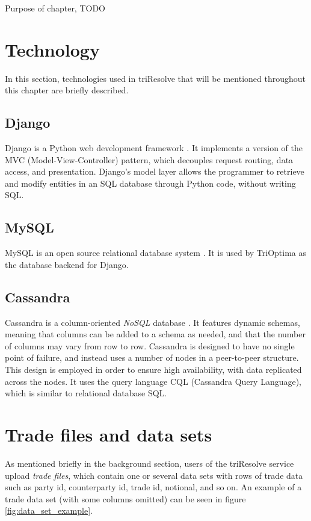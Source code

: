 Purpose of chapter, TODO

\section{Technology}
In this section, technologies used in triResolve that will be mentioned throughout this chapter are briefly described.

\subsection{Django}
Django is a Python web development framework \cite{holovaty_chapter_c1itd}. It implements a version of the MVC (Model-View-Controller) pattern, which decouples request routing, data access, and
presentation. Django's model layer allows the programmer to retrieve and modify entities in an SQL database through Python code, without writing SQL.

\subsection{MySQL}
MySQL is an open source relational database system \cite{what_wim}. It is used by TriOptima as the database backend for Django.

\subsection{Cassandra}
Cassandra is a column-oriented \textit{NoSQL} database \cite[p. 1-9]{mishra_2014_beginning_bacd}. It features dynamic schemas, meaning that columns can be added to a schema as needed, and that
the number of columns may vary from row to row. Cassandra is designed to have no single point of failure, and instead uses a number of nodes in a peer-to-peer structure. This design is
employed in order to ensure high availability, with data replicated across the nodes. It uses the query language CQL (Cassandra Query Language), which is similar to relational database SQL.

\section{Trade files and data sets}
As mentioned briefly in the background section, users of the triResolve service upload \textit{trade files}, which contain one or several data sets with
rows of trade data such as party id, counterparty id, trade id, notional, and so on. An example of a trade data set (with some columns omitted) can be seen in figure
\ref{fig:data_set_example}.

